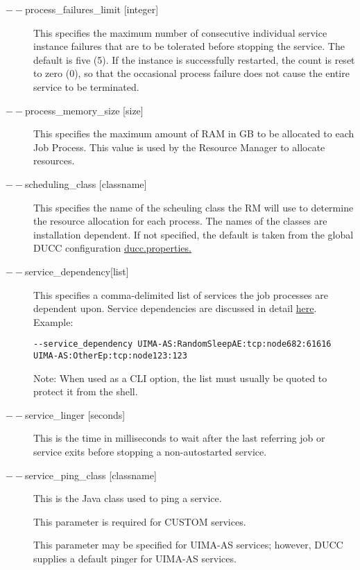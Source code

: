 \begin{description}
      \item[$--$process\_failures\_limit {[integer]}] 
        This specifies the maximum number of consecutive individual service instance failures that are to be 
        tolerated before stopping the service. The default is five (5). If the instance is successfully
        restarted, the count is reset to zero (0), so that the occasional process failure does not cause
        the entire service to be terminated.
        
      \item[$--$process\_memory\_size {[size]}] This specifies the maximum amount of RAM in GB to be
        allocated to each Job Process.  This value is used by the Resource Manager to allocate
        resources. 

      \item[$--$scheduling\_class {[classname]}] This specifies the name of the scheuling class the RM
        will use to determine the resource allocation for each process. The names of the classes are
        installation dependent. If not specified, the default is taken from the global DUCC
        configuration \hyperref[sec:ducc.properties]{ducc.properties.}

      \item[$--$service\_dependency{[list]}] This specifies a comma-delimited list of services the job
        processes are dependent upon. Service dependencies are discussed in detail
        \hyperref[sec:service.endpoints]{here}. Example:
\begin{verbatim}
--service_dependency UIMA-AS:RandomSleepAE:tcp:node682:61616 UIMA-AS:OtherEp:tcp:node123:123 
\end{verbatim}

        Note: When used as a CLI option, the list must usually be
        quoted to protect it from the shell.
          

      \item[$--$service\_linger {[seconds]}] This is the time in milliseconds to wait after the last
        referring job or service exits before stopping a non-autostarted service.

      \item[$--$service\_ping\_class {[classname]}] This is the Java class used to ping a service. 

        This parameter is required for CUSTOM services.

        This parameter may be specified for UIMA-AS services; however, DUCC supplies a default
        pinger for UIMA-AS services.


\end{description}
